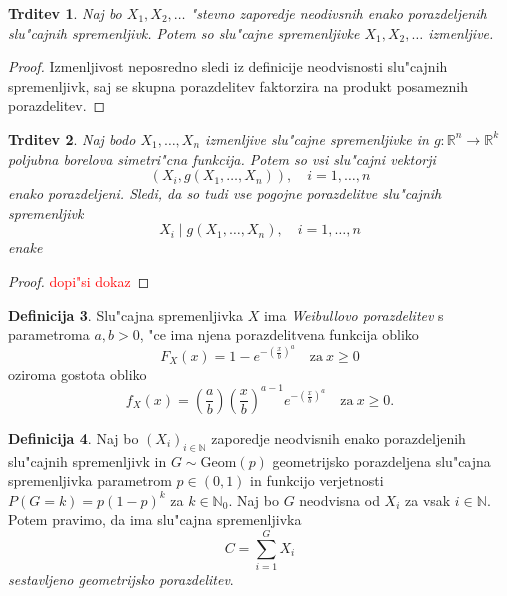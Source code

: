 \documentclass[12pt, a4paper, reqno]{amsart}
\theoremstyle{definition}
\newtheorem{definicija}{Definicija}[section]
\theoremstyle{plain}
\newtheorem{trditev}[definicija]{Trditev}
\newcommand{\R}{\mathbb{R}}
\newcommand{\N}{\mathbb{N}}
\newcommand{\1}{\mathds{1}}
\begin{document}
    \begin{trditev}
        Naj bo $X_1, X_2, \dots$ "stevno zaporedje neodivsnih enako porazdeljenih slu"cajnih spremenljivk. 
        Potem so slu"cajne spremenljivke $X_1, X_2, \dots$ izmenljive.
    \end{trditev}

    \begin{proof}
        Izmenljivost neposredno sledi iz definicije neodvisnosti slu"cajnih spremenljivk, saj se 
        skupna porazdelitev faktorzira na produkt posameznih porazdelitev.
    \end{proof}

    \begin{trditev}
        Naj bodo $X_1, \dots, X_n$ izmenljive slu"cajne spremenljivke in $g: \R^n \rightarrow \R^k$
        poljubna borelova simetri"cna funkcija. Potem so vsi slu"cajni vektorji 
        $$
            (X_i, g(X_1, \dots, X_n)),  \quad i = 1, \dots, n
        $$
        enako porazdeljeni. Sledi, da so tudi vse pogojne porazdelitve slu"cajnih spremenljivk
        $$
            X_i\mid g(X_1, \dots, X_n), \quad i = 1, \dots, n
        $$
        enake
        \label{trd:izmenljivostSimetricnaFunkcija}
    \end{trditev}

    \begin{proof}
        \textcolor{red}{dopi"si dokaz}
    \end{proof}

    \begin{definicija}
        Slu"cajna spremenljivka $X$ ima \textit{Weibullovo porazdelitev} s parametroma $a, b > 0$, 
        "ce ima njena porazdelitvena funkcija obliko 
        \begin{equation*}
            F_X(x) = 1 - e^{-\left(\tfrac{x}{b}\right)^a} \quad \text{za} \ x\geq 0
        \end{equation*}
        oziroma gostota obliko
        \begin{equation*}
            f_X(x) = \left(\frac{a}{b}\right)\left(\frac{x}{b}\right)^{a-1}e^{-\left(\tfrac{x}{b}\right)^a} \quad \text{za} \ x\geq 0.
        \end{equation*}
        \label{def:WeibullovaPorazdelitev}
    \end{definicija}

    \begin{definicija}
        Naj bo $(X_i)_{i\in\N}$ zaporedje neodvisnih enako porazdeljenih slu"cajnih spremenljivk in 
        $G \sim \text{Geom}(p)$ geometrijsko porazdeljena slu"cajna spremenljivka  parametrom $p\in(0, 1)$ in 
        funkcijo verjetnosti $P(G = k) = p(1 - p)^{k}$ za $k\in\N_0$.
        Naj bo $G$ neodvisna od $X_i$ za vsak $i\in\N$. Potem pravimo, da ima slu"cajna spremenljivka
        \begin{equation*}
            C = \sum_{i= 1}^{G} X_i
        \end{equation*}
        \textit{sestavljeno geometrijsko porazdelitev}.
        \label{def:CompoundGeometricDistribution}
    \end{definicija}
\end{document}
